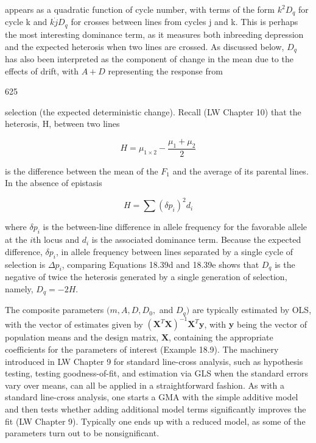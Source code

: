 \documentclass{article}
\begin{document}
appears as a quadratic function of cycle number, with terms of the form  $ k^{2}D_{q} $ for cycle k and  $ k\dot{j}D_{q} $ for crosses between lines from cycles j and k. This is perhaps the most interesting dominance term, as it measures both inbreeding depression and the expected heterosis when two lines are crossed. As discussed below,  $ D_{q} $ has also been interpreted as the component of change in the mean due to the effects of drift, with  $ A + D $ representing the response from

625

selection (the expected deterministic change). Recall (LW Chapter 10) that the heterosis, H, between two lines

\begin{equation}
H=\mu_{1\times2}-\frac{\mu_{1}+\mu_{2}}{2}
\end{equation}

is the difference between the mean of the  $ F_{1} $ and the average of its parental lines. In the absence of epistasis

\begin{equation}
H=\sum(\delta p_{i})^{2}d_{i}
\tag{18.39e}
\label{eq:18_39e}
\end{equation}

where  $ \delta p_i $ is the between-line difference in allele frequency for the favorable allele at the  $ i $th locus and  $ d_i $ is the associated dominance term. Because the expected difference,  $ \delta p_i $, in allele frequency between lines separated by a single cycle of selection is  $ \Delta p_i $, comparing Equations 18.39d and 18.39e shows that  $ D_q $ is the negative of twice the heterosis generated by a single generation of selection, namely,  $ D_q = -2H $.

The composite parameters  $ (m, A, D, D_0, $ and  $ D_q) $ are typically estimated by OLS, with the vector of estimates given by  $ \left(\mathbf{X}^T\mathbf{X}\right)^{-1}\mathbf{X}^T\mathbf{y} $, with  $ \mathbf{y} $ being the vector of population means and the design matrix,  $ \mathbf{X} $, containing the appropriate coefficients for the parameters of interest (Example 18.9). The machinery introduced in LW Chapter 9 for standard line-cross analysis, such as hypothesis testing, testing goodness-of-fit, and estimation via GLS when the standard errors vary over means, can all be applied in a straightforward fashion. As with a standard line-cross analysis, one starts a GMA with the simple additive model and then tests whether adding additional model terms significantly improves the fit (LW Chapter 9). Typically one ends up with a reduced model, as some of the parameters turn out to be nonsignificant.
\end{document}
